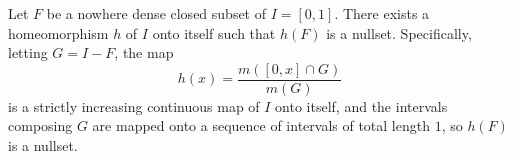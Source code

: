Let $F$ be a nowhere dense closed subset of $I = [0, 1]$. There exists a homeomorphism $h$ of $I$ onto itself such that $h(F)$ is a nullset. Specifically, letting $G = I - F$, the map
$$h(x) = \frac{m([0, x] \cap G)}{m(G)}$$
is a strictly increasing continuous map of $I$ onto itself, and the intervals composing $G$ are mapped onto a sequence of intervals of total length $1$, so $h(F)$ is a nullset.
